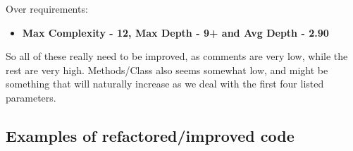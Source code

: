\documentclass{article}
\begin{document}
\hspace{-.5cm}Over requirements:

\begin{itemize}
\item
\textbf{Max Complexity - 12, Max Depth - 9+ and Avg Depth - 2.90} 
\end{itemize}

So all of these really need to be improved, as comments are very low, while the rest are very high. Methods/Class also seems somewhat low, and might be something that will naturally increase as we deal with the first four listed parameters.


\subsection{Examples of refactored/improved code}
\end{document}
